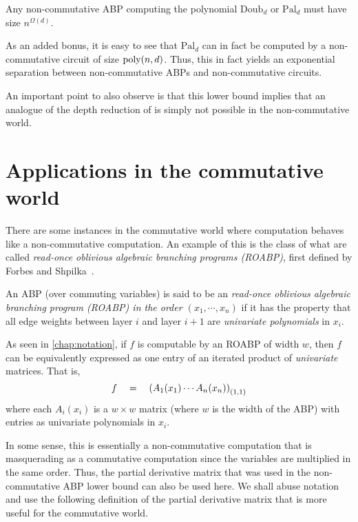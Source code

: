 \begin{theorem} Any non-commutative ABP computing the polynomial $\mathrm{Doub}_d$ or $\mathrm{Pal}_d$ must have size $n^{\Omega(d)}$. 
\end{theorem}

As an added bonus, it is easy to see that $\mathrm{Pal}_d$ can in fact be computed by a non-commutative circuit of size $\operatorname{poly}(n,d)$.
Thus, this in fact yields an exponential separation between non-commutative ABPs and non-commutative circuits.
 
An important point to also observe is that this lower bound implies that an analogue of the depth reduction of \cite{vsbr83} is simply not possible in the non-commutative world. 

\section{Applications in the commutative world}

There are some instances in the commutative world where computation behaves like a non-commutative computation.
An example of this is the class of what are called \emph{read-once oblivious algebraic branching programs (ROABP)}, first defined by Forbes and Shpilka~\cite{FS13}. 


\begin{definition}
An ABP (over commuting variables) is said to be an \emph{read-once oblivious algebraic branching program (ROABP) in the order $(x_1,\cdots, x_n)$} if it has the property that all edge weights between layer $i$ and layer $i+1$ are \emph{univariate polynomials} in $x_i$.
\end{definition}


As seen in \autoref{chap:notation}, if $f$ is computable by an ROABP of width $w$,  then $f$ can be equivalently expressed as one entry of an iterated product of \emph{univariate} matrices.
That is,
\[
f \quad = \quad \left(A_{1}(x_1) \cdots A_n(x_n)\right)_{(1,1)}
\]
where each $A_i(x_i)$ is a $w\times w$ matrix (where $w$ is the width of the ABP) with entries as univariate polynomials in $x_i$. 

In some sense, this is essentially a non-commutative computation that is masquerading as a commutative computation since the variables are multiplied in the same order.
Thus, the partial derivative matrix that was used in the non-commutative ABP lower bound can also be used here.
We shall abuse notation and use the following definition of the partial derivative matrix that is more useful for the commutative world.

